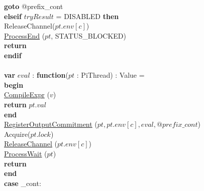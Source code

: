 \documentclass[a4paper,11pt]{article}
\newenvironment{program}{
  \begin{sffamily}
  \begin{scriptsize}
  \begin{tabbing}}
 {\end{tabbing}
  \end{scriptsize}
  \end{sffamily}}
\newcommand{\kw}[1]{\textsf{\textbf{#1}}}
\newcommand{\pindent}{\hspace{2em}\=}
\newcommand{\compiletime}[1]{\textcolor{compilecolor}{#1}}
\newcommand{\synchro}[1]{\textcolor{synchrocolor}{#1}}
\newcommand{\myref}[1]{
  \hyperref[#1]{#1}
}
\begin{document}
\begin{program}
  \>\>\kw{goto} @prefix\_cont \\
 \> \kw{elseif} $tryResult$ = DISABLED \kw{then} \\
 \> \> \synchro{ReleaseChannel($pt.env[c]$)} \\
 \> \> \myref{ProcessEnd}($pt$, STATUS\_BLOCKED) \\
 \> \> \kw{return} \\
 \> \kw{endif}\\
\\
  \>\kw{var} $eval$ : \kw{function}($pt$ : PiThread) : Value = \\
  \>\pindent\kw{begin} \\
  \>\>\pindent\compiletime{\myref{CompileExpr}($v$)} \\
  \>\>\>\kw{return} $pt.val$ \\
  \>\> \kw{end} \\
  \> \myref{RegisterOutputCommitment}($pt, pt.env[c], eval, @prefix\_cont$) \\
  \>\synchro{Acquire($pt.lock$)} \\
  \>\synchro{\myref{ReleaseChannel}($pt.env[c]$)} \\
  \>\synchro{\myref{ProcessWait}($pt$)} \\
  \>\kw{return} \\
  \kw{end} \\
 \kw{case} \@prefix\_cont:
\end{program}
\end{document}
